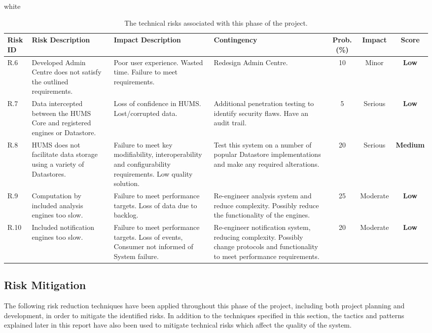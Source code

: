 \documentclass[10pt,a4paper]{article}
\newcommand{\xtableformat}[4]{
\begin{table}[ht!]
\centering
  \rowcolors{2}{gray!10} {white}
\begin{tabularx}{\textwidth}{#1}
  \hline
  \rowcolor[gray]{0.9} #2
  \hline
\end{tabularx}
\caption{#3}
\label{#4}
\end{table}}
\begin{document}
\xtableformat{p{0.8cm} X X X c c c}
{ 	\hline
    Risk ID & Risk \newline Description & Impact \newline Description & Contingency & Prob. (\%) & Impact & Score \\
  	\hline
  
    R.6 & Developed Admin Centre does not satisfy the outlined requirements. & Poor user experience. Wasted time. Failure to meet requirements. & Redesign Admin Centre. & 10 & Minor & \textbf{Low} \\
    R.7 & Data intercepted between the HUMS Core and registered engines or Datastore. & Loss of confidence in HUMS. Lost/corrupted data. & Additional penetration testing to identify security flaws. Have an audit trail. & 5 & Serious &  \textbf{Low} \\
    R.8 & HUMS does not facilitate data storage using a variety of Datastores. & Failure to meet key modifiability, interoperability and configurability requirements. Low quality solution. & Test this system on a number of popular Datastore implementations and make any required alterations. & 20 & Serious & \textbf{Medium} \\
    R.9 & Computation by included analysis engines too slow. & Failure to meet performance targets. Loss of data due to backlog. & Re-engineer analysis system and reduce complexity. Possibly reduce the functionality of the engines. & 25 & Moderate & \textbf{Low} \\	
    R.10 & Included notification engines too slow. & Failure to meet performance targets. Loss of events, Consumer not informed of System failure. & Re-engineer notification system, reducing complexity. Possibly change protocols and functionality to meet performance requirements. & 20 & Moderate & \textbf{Low} \\	
}
{The technical risks associated with this phase of the project.}{tab:tech_risks}

\subsection{Risk Mitigation}
The following risk reduction techniques have been applied throughout this phase of the project, including both project planning and development, in order to mitigate the identified risks. In addition to the techniques specified in this section, the tactics and patterns explained later in this report have also been used to mitigate technical risks which affect the quality of the system.
\end{document}
